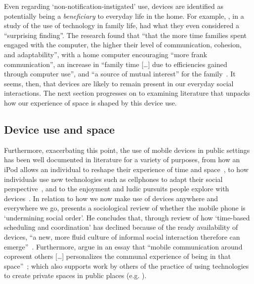 Even regarding `non-notification-instigated' use, devices are identified as potentially being a \textit{beneficiary} to everyday life in the home.
For example, \citet{Lanigan2009}, in a study of the use of technology in family life, had what they even considered a ``surprising finding''.
The research found that ``that the more time families spent engaged with the computer, the higher their level of communication, cohesion, and adaptability'', with a home computer encouraging ``more frank communication'', an increase in ``family time [\ldots] due to efficiencies gained through computer use'', and ``a source of mutual interest'' for the family~\citep[p. 603]{Lanigan2009}.
It seems, then, that devices are likely to remain present in our everyday social interactions.
The next section progresses on to examining literature that unpacks how our experience of space is shaped by this device use.






\subsection{Device use and space}\label{sec:background litreview society space}
Furthermore, exacerbating this point, the use of mobile devices in public settings has been well documented in literature for a variety of purposes, from how an iPod allows an individual to reshape their experience of time and space~\citep{Bull2005}, to how individuals use new technologies such as cellphones to adapt their social perspective~\citep{Humphreys2005,Oksman2004,Peters2005}, and to the enjoyment and ludic pursuits people explore with devices~\citep{Brown2015a}.
In relation to how we now make use of devices anywhere and everywhere we go, \citet{Geser2006} presents a sociological review of whether the mobile phone is `undermining social order'.
He concludes that, through review of how `time-based scheduling and coordination' has declined because of the ready availability of devices, ``a new, more fluid culture of informal social interaction therefore can emerge''~\citep[pp. 5--6]{Geser2006}.
Furthermore, \citet{Campbell2008} argue in an essay that ``mobile communication around copresent others [\ldots] personalizes the communal experience of being in that space''~\citep[p. 379]{Campbell2008}; which also supports work by others of the practice of using technologies to create private spaces in public places (e.g. \citet{Ames2013,Wei1999}).

